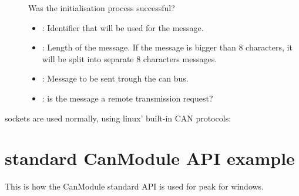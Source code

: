 \documentclass[letterpaper,10pt,english]{sphinxmanual}
\begin{document}
\begin{fulllineitems}
\begin{fulllineitems}
\begin{description}
\item[{}] \leavevmode
Was the initialisation process successful? 

\item[{}] \leavevmode\begin{itemize}
\item {} 
: Identifier that will be used for the message. 

\item {} 
: Length of the message. If the message is bigger than 8 characters, it will be split into separate 8 characters messages. 

\item {} 
: Message to be sent trough the can bus. 

\item {} 
: is the message a remote transmission request? 

\end{itemize}

\end{description}


\end{fulllineitems}


\end{fulllineitems}


sockets are used normally, using linux’ built-in CAN protocols:

\begin{sphinxVerbatim}[commandchars=\\\{\}]
    
\end{sphinxVerbatim}


\section{standard CanModule API example}
\label{\detokenize{vendors/peak:standard-canmodule-api-example}}
This is how the CanModule standard API is used for peak for windows.
\end{document}
